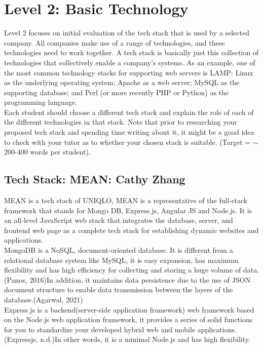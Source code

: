 \documentclass[a4paper, 11pt]{report}
\begin{document}
\newpage
\section{Level 2: Basic Technology}

Level 2 focuses on initial evaluation of the tech stack that is used by a selected company. All companies make use of a range of technologies, and these technologies need to work together. A tech stack is basically just this collection of technologies that collectively enable a company's systems. As an example, one of the most common technology stacks for supporting web servers is LAMP: Linux as the underlying operating system; Apache as a web server; MySQL as the supporting database; and Perl (or more recently PHP or Python) as the programming language.\\

Each student should choose a different tech stack and explain the role of each of the different technologies in that stack. Note that prior to researching your proposed tech stack and spending time writing about it, it might be a good idea to check with your tutor as to whether your chosen stack is suitable. (Target = $\sim$200-400 words per student).

\subsection{Tech Stack: MEAN: Cathy Zhang}

\noindent MEAN is a tech stack of UNIQLO, MEAN is a representative of the full-stack framework that stands for Mongo DB, Express.js, Angular JS and Node.js. It is an all-level JavaScript web stack that integrates the database, server, and frontend web page as a complete tech stack for establishing dynamic websites and applications. \\

\noindent MongoDB is a NoSQL, document-oriented database. It is different from a relational database system like MySQL, it is easy expansion, has maximum flexibility and has high efficiency for collecting and storing a huge volume of data. (Panos, 2016)In addition, it maintains data persistence due to the use of JSON document structure to enable data transmission between the layers of the database.(Agarwal, 2021)\\

\noindent Express.js is a backend(server-side application framework) web framework based on the Node.js web application framework, it provides a series of solid functions for you to standardize your developed hybrid web and mobile applications. (Expressjs, n.d.)In other words, it is a minimal Node.js and has high flexibility.\\
\end{document}
